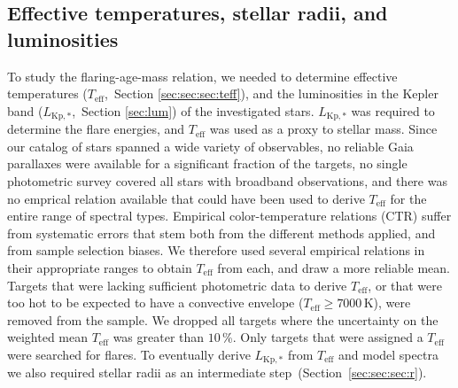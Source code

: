 \documentclass{aa}
\begin{document}
\subsection{Effective temperatures, stellar radii, and luminosities}
\label{TeffRL}
To study the flaring-age-mass relation, we needed to determine effective temperatures ($T_\mathrm{eff}$,~Section \ref{sec:sec:sec:teff}), and the luminosities in the Kepler band ($L_\mathrm{Kp,*}$,~Section \ref{sec:lum}) of the investigated stars. $L_\mathrm{Kp,*}$ was required to determine the flare energies, and $T_\mathrm{eff}$ was used as a proxy to stellar mass. Since our catalog of stars spanned a wide variety of observables, no reliable Gaia parallaxes were available for a significant fraction of the targets, no single photometric survey covered all stars with broadband observations, and there was no emprical relation available that could have been used to derive $T_\mathrm{eff}$ for the entire range of spectral types. Empirical color-temperature relations (CTR) suffer from systematic errors that stem both from the different methods applied, and from sample selection biases. We therefore used several empirical relations in their appropriate ranges to obtain $T_\mathrm{eff}$ from each, and draw a more reliable mean. Targets that were lacking sufficient photometric data to derive $T_\mathrm{eff}$, or that were too hot to be expected to have a convective envelope ($T_\mathrm{eff} \geq 7000\,$K), were removed from the sample. We dropped all targets where the uncertainty on the weighted mean $T_\mathrm{eff}$ was greater than $10\,$\%. Only targets that were assigned a $T_\mathrm{eff}$ were searched for flares. To eventually derive $L_\mathrm{Kp,*}$ from $T_\mathrm{eff}$ and model spectra we also required stellar radii as an intermediate step~(Section~\ref{sec:sec:sec:r}).
\end{document}
